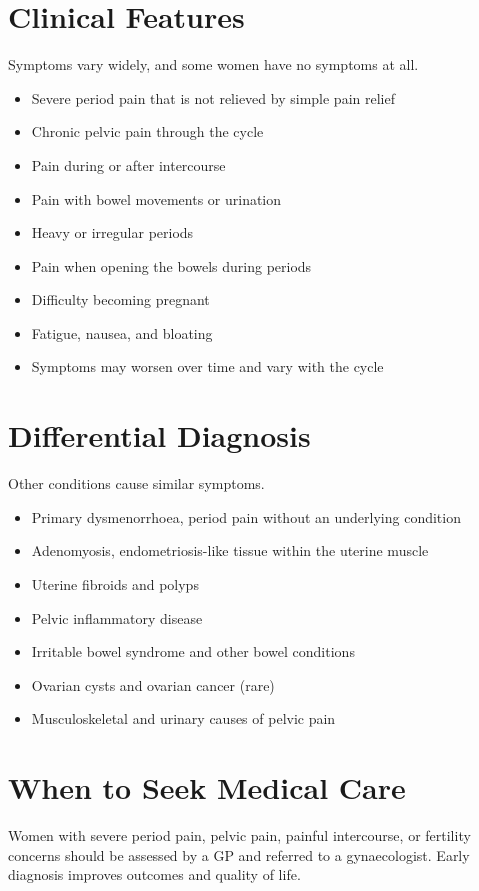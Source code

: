 \section*{Clinical Features}
Symptoms vary widely, and some women have no symptoms at all.
\begin{itemize}
    \item Severe period pain that is not relieved by simple pain relief
    \item Chronic pelvic pain through the cycle
    \item Pain during or after intercourse
    \item Pain with bowel movements or urination
    \item Heavy or irregular periods
    \item Pain when opening the bowels during periods
    \item Difficulty becoming pregnant
    \item Fatigue, nausea, and bloating
    \item Symptoms may worsen over time and vary with the cycle
\end{itemize}

\section*{Differential Diagnosis}
Other conditions cause similar symptoms.
\begin{itemize}
    \item Primary dysmenorrhoea, period pain without an underlying condition
    \item Adenomyosis, endometriosis-like tissue within the uterine muscle
    \item Uterine fibroids and polyps
    \item Pelvic inflammatory disease
    \item Irritable bowel syndrome and other bowel conditions
    \item Ovarian cysts and ovarian cancer (rare)
    \item Musculoskeletal and urinary causes of pelvic pain
\end{itemize}

\section*{When to Seek Medical Care}
Women with severe period pain, pelvic pain, painful intercourse, or fertility concerns should be assessed by a GP and referred to a gynaecologist. Early diagnosis improves outcomes and quality of life.

